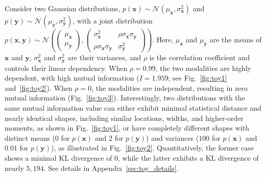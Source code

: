 \begin{example}
\label{example:mi-div}
Consider two Gaussian distributions, \(p(\mathbf{x}) \sim \mathcal{N} (\mu_\mathbf{x}, \sigma_\mathbf{x}^2)\) and \(p(\mathbf{y}) \sim \mathcal{N} (\mu_\mathbf{y}, \sigma_\mathbf{y}^2)\), with a joint distribution \(p(\mathbf{x}, \mathbf{y}) \sim \mathcal{N}\left(
\begin{pmatrix}
    \mu_\mathbf{x} \\
    \mu_\mathbf{y}
\end{pmatrix}, 
\begin{pmatrix}
    \sigma_\mathbf{x}^2 & \rho\sigma_\mathbf{x}\sigma_\mathbf{y} \\
    \rho\sigma_\mathbf{x}\sigma_\mathbf{y} & \sigma_\mathbf{y}^2
\end{pmatrix} 
\right)\). Here, \(\mu_\mathbf{x}\) and \(\mu_\mathbf{y}\) are the means of \(\mathbf{x}\) and \(\mathbf{y}\), \(\sigma_\mathbf{x}^2\) and \(\sigma_\mathbf{y}^2\) are their variances, and \(\rho\) is the correlation coefficient and  controls their linear dependency.  When \(\rho = 0.99\), the two modalities are highly dependent, with high mutual information (\(I = 1.959\); see Fig.~\ref{fig:toy1} and~\ref{fig:toy2}). When \(\rho = 0\), the modalities are independent, resulting in zero mutual information (Fig.~\ref{fig:toy3}).  
{Interestingly, two distributions with the same mutual information value can either exhibit minimal statistical distance and nearly identical shapes, including similar locations, widths, and higher-order moments, as shown in Fig.~\ref{fig:toy1}, or have completely different shapes with distinct means ($0$ for $p(\mathbf{x})$ and $2$ for $p(\mathbf{y})$) and variances ($100$ for $p(\mathbf{x})$ and $0.01$ for $p(\mathbf{y})$), 
as illustrated in Fig.~\ref{fig:toy2}. Quantitatively, the former case shows a minimal KL divergence of $0$, while the latter exhibits a KL divergence of nearly $5,194$.} See details in Appendix~\ref{sec:toy_details}.
\end{example}

